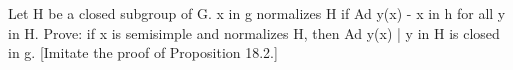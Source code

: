 Let H be a closed subgroup of G. x in g normalizes H if Ad y(x) - x in h for all y in H. Prove: if x is semisimple and normalizes H, then {Ad y(x) | y in H} is closed in g. [Imitate the proof of Proposition 18.2.]

